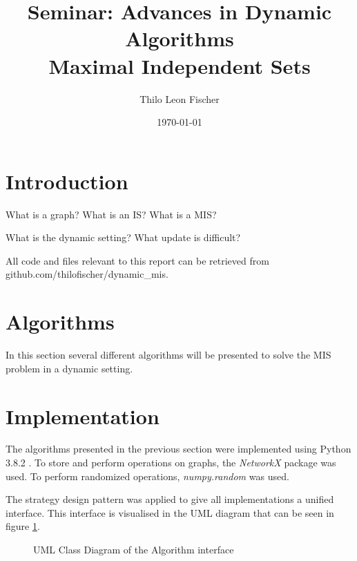 \documentclass[letterpaper,12pt]{article}
\begin{document}
\title{Seminar: Advances in Dynamic Algorithms \\ Maximal Independent Sets}
\author{Thilo Leon Fischer}
\date{\today}
\maketitle

\begin{abstract}
\end{abstract}


\section{Introduction}

What is a graph?
What is an IS?
What is a MIS?

What is the dynamic setting?
What update is difficult?

All code and files relevant to this report can be retrieved from github.com/thilofischer/dynamic\_mis.

\section{Algorithms}

In this section several different algorithms will be presented to solve the
MIS problem in a dynamic setting.

\section{Implementation}

The algorithms presented in the previous section were implemented using Python
3.8.2 . To store and perform operations on graphs, the \textit{NetworkX}
package was used.
To perform randomized operations, \textit{numpy.random} was used.

\bigskip

The strategy design pattern was applied to give all implementations a unified
interface. This interface is visualised in the UML diagram that can be seen in
figure \ref{fig:uml}.

%
%

\begin{figure}[h]
  \begin{center}
  \end{center}
  \label{fig:uml}
  \caption{UML Class Diagram of the Algorithm interface}
\end{figure}
\end{document}
